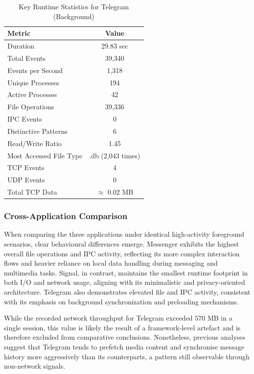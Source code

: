 \documentclass[a4paper,12pt]{report}
\begin{document}
\begin{table}[H]
    \centering
    \caption{Key Runtime Statistics for Telegram (Background)}
    \label{tab:telegram_background_stats}
    \begin{tabular}{|l|c|}
        \hline
        \textbf{Metric} & \textbf{Value} \\
        \hline
        Duration & 29.83 sec \\
        Total Events & 39,340 \\
        Events per Second & 1,318 \\
        Unique Processes & 194 \\
        Active Processes & 42 \\
        File Operations & 39,336 \\
        IPC Events & 0 \\
        Distinctive Patterns & 6 \\
        Read/Write Ratio & 1.45 \\
        Most Accessed File Type & .db (2,043 times) \\
        TCP Events & 4 \\
        UDP Events & 0 \\
        Total TCP Data & $\approx$ 0.02 MB \\
        \hline
    \end{tabular}
\end{table}


\subsubsection{Cross-Application Comparison}

When comparing the three applications under identical high-activity foreground scenarios, clear behavioural differences emerge. Messenger exhibits the highest overall file operations and IPC activity, reflecting its more complex interaction flows and heavier reliance on local data handling during messaging and multimedia tasks. Signal, in contrast, maintains the smallest runtime footprint in both I/O and network usage, aligning with its minimalistic and privacy-oriented architecture. Telegram also demonstrates elevated file and IPC activity, consistent with its emphasis on background synchronization and preloading mechanisms.

While the recorded network throughput for Telegram exceeded $570$ MB in a single session, this value is likely the result of a framework-level artefact and is therefore excluded from comparative conclusions. Nonetheless, previous analyses suggest that Telegram tends to prefetch media content and synchronise message history more aggressively than its counterparts, a pattern still observable through non-network signals.
\end{document}
